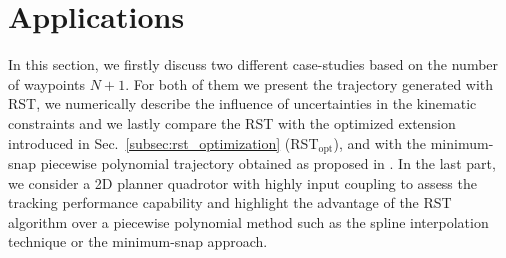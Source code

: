 \section{Applications}
\label{subsec:rst_examples}
In this section, we firstly discuss two different case-studies based on the number of waypoints $N+1$. For both of them we present the trajectory generated with RST, we numerically describe the influence of uncertainties in the kinematic constraints and we lastly compare the RST with the optimized extension introduced in Sec.~\ref{subsec:rst_optimization} (RST$_{\text{opt}}$), and with the minimum-snap piecewise polynomial trajectory obtained as proposed in \cite{5980409}.
In the last part, we consider a 2D planner quadrotor with highly input coupling   to assess the tracking performance capability and highlight the advantage of the RST algorithm over a piecewise polynomial method such as the spline interpolation technique or the minimum-snap approach.

